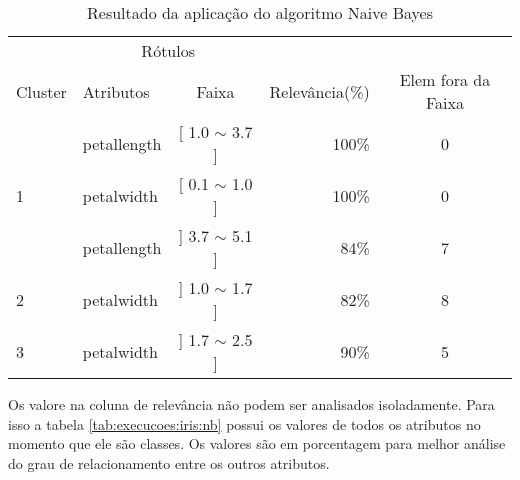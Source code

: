 \begin{table}[!h]
\centering
\caption{Resultado da aplicação do algoritmo Naive Bayes}
\label{tab:rot:iris:nb}
\begin{tabular}{llcrc} \hline
 
\multicolumn{1}{c}{\cellcolor[HTML]{FFFFFF}} & \multicolumn{2}{c}{Rótulos}                & \multicolumn{1}{r}{}               & \\ \cline{2-3}
Cluster                                      & Atributos      & \multicolumn{1}{c}{Faixa} & \multicolumn{1}{c}{Relevância(\%)} & Elem fora da Faixa\\ \hline \hline
                                             & petallength    & [ 1.0 $\sim$  3.7 ]       & 100\%                               & 0 \\  
\multirow{-2}{*}{1}                          & petalwidth     & [ 0.1 $\sim$  1.0 ]       & 100\%                               & 0 \\  \hline
                                             & petallength    & ] 3.7 $\sim$  5.1 ]       & 84\%                               & 7\\ 
\multirow{-2}{*}{2}                          & petalwidth     & ] 1.0 $\sim$  1.7 ]       & 82\%                               & 8\\  \hline
3                                            & petalwidth     & ] 1.7 $\sim$  2.5 ]       & 90\%                               & 5\\ \hline \hline
\end{tabular}
\end{table}

Os valore na coluna de relevância não podem ser analisados isoladamente. Para isso  a tabela \ref{tab:execucoes:iris:nb} possui os valores de todos os atributos no momento que ele são classes. Os valores são em porcentagem para melhor análise do grau de relacionamento entre os outros atributos.

